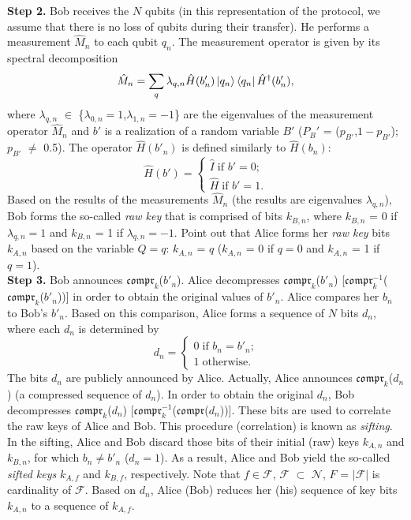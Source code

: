 \documentclass[journal,onecolumn]{IEEEtran}
\theoremstyle{thmstyleone}%
\theoremstyle{thmstyletwo}%
\theoremstyle{thmstylethree}%
\begin{document}
	\textbf{Step 2.} Bob receives the $N$ qubits (in this representation of the protocol, we assume that there is no loss of qubits during their transfer). He performs a measurement $\hat{M}_n$ to each qubit $q_n$. The measurement operator is given by its spectral decomposition 
	\begin{equation}
		\hat{M}_n = \sum_q \lambda_{q,n}\hat{H}(b'_n)\ket{q_n}\bra{q_n}\hat{H}^{\dagger}(b'_n),
	\end{equation}
	where $\lambda_{q,n}$ $\in$ \{$\lambda_{\text{0},n}=\text{1}$,$\lambda_{\text{1},n}=-\text{1}$\} are the eigenvalues of the measurement operator $\hat{M}_n$ and $b'$ is a realization of a random variable $B'$ ($P_B'$ = ($p_{B'}$,$\text{1}-p_{B'}$); $p_{B'}$ $\neq$ 0.5). The operator $\hat{H}(b'_n)$ is defined similarly to  $\hat{H}(b_n)$:
	\begin{equation}
		\hat{H}(b') = \begin{cases}
			\hat{I} \; \text{if $b' = \text{0}$;}\\
			\hat{H} \; \text{if $b' = \text{1}$.}
		\end{cases}
	\end{equation}
	Based on the results of the measurements $\hat{M}_n$ (the results are eigenvalues $\lambda_{q,n}$), Bob forms the so-called \textit{raw key} that is comprised of bits $k_{B,n}$, where $k_{B,n}$ = 0 if $\lambda_{q,n}=\text{1}$ and $k_{B,n}$ = 1 if $\lambda_{q,n}=-\text{1}$. Point out that Alice forms her \textit{raw key} bits $k_{A,n}$ based on the variable $Q=q$: $k_{A,n}$ = $q$ ($k_{A,n}$ = 0 if $q=\text{0}$ and $k_{A,n}$ = 1 if $q=\text{1}$). \\
	\textbf{Step 3.} Bob announces $\mathfrak{compr}_k$($b'_n$). Alice decompresses $\mathfrak{compr}_k$($b'_n$) [$\mathfrak{compr}_k^{-\text{1}}$($\mathfrak{compr}_k$($b'_n$))] in order to obtain the original values of $b'_n$. Alice compares her $b_n$ to Bob's $b'_n$. Based on this comparison, Alice forms a sequence of $N$ bits $d_n$, where each $d_n$ is determined by 
	\begin{equation}
		d_n = \begin{cases}
			\text{0} \; \text{if $b_n=b'_n$;}\\
			\text{1}  \; \text{otherwise.}
		\end{cases}
	\end{equation}
	The bits $d_n$ are publicly announced by Alice. Actually, Alice announces $\mathfrak{compr}_k$($d_n$) (a compressed sequence of $d_n$). In order to obtain the original $d_n$, Bob decompresses $\mathfrak{compr}_k$($d_n$) [$\mathfrak{compr}_k^{-\text{1}}$($\mathfrak{compr}$($d_n$))]. These bits are used to correlate the raw keys of Alice and Bob. This procedure (correlation) is known as \textit{sifting}. In the sifting, Alice and Bob discard those bits of their initial (raw) keys $k_{A,n}$ and $k_{B,n}$, for which $b_n \neq b'_n$ ($d_n=\text{1}$). As a result, Alice and Bob yield the so-called \textit{sifted keys} $k_{A,f}$ and $k_{B,f}$, respectively. Note that $f \in \mathcal{F}$, $\mathcal{F}$  $\subset$ $\mathcal{N}$, $F$ = $|\mathcal{F}|$ is cardinality of $\mathcal{F}$. Based on $d_n$, Alice (Bob) reduces her (his) sequence of key bits $k_{A,n}$ to a sequence of $k_{A,f}$.  \\
\end{document}
